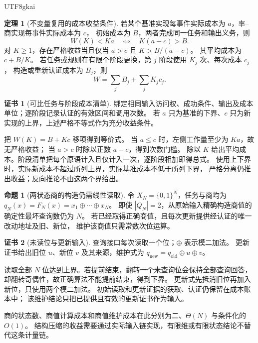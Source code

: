 \documentclass[12pt]{report}
\makeatletter
\theoremstyle{definition}
\newtheorem{theorem}{定理}[chapter]
\newtheorem{proposition}{命题}[chapter]
\newtheorem{Certificate}{证书}[chapter]
\renewenvironment{proof}[1][\proofname]{\par
  \pushQED{\qed}\normalfont
  \topsep6\p@\@plus6\p@\relax
  \trivlist
  \item[\hskip\labelsep\normalfont #1\@addpunct{.}]\ignorespaces
}{
  \popQED\endtrivlist\@endpefalse
}
\makeatother
\begin{document}
\begin{CJK*}{UTF8}{gkai}
\begin{theorem}[不变量复用的成本收益条件]
\label{thm:amortized-quotient-cost}
若某个基准实现每事件实际成本为 \(a\)，率--商实现每事件实际成本为 \(c\)，
初始成本为 \(B\)，两者完成同一任务和输出义务，则
\[
W(K)<Ka\quad\Longleftrightarrow\quad K(a-c)>B.
\]
对 \(K\ge1\)，存在严格收益当且仅当 \(a>c\) 且 \(K>B/(a-c)\)。
其平均成本为 \(c+B/K\)。
若任务或规则在有限个阶段更换，第 \(j\) 阶段使用 \(K_j\) 次、每次成本 \(c_j\)，
构造或重新认证成本为 \(B_j\)，则
\[
W=\sum_j B_j+\sum_j K_jc_j.
\]
\end{theorem}
\begin{Certificate}[可比任务与阶段成本清单]
绑定相同输入访问权、成功条件、输出及成本单位；逐阶段记录认证的有效区间和调用次数。
若 \(a\) 只为基准的下界、\(c\) 只为新实现的上界，上述严格不等式作为充分收益条件。
\end{Certificate}
\begin{proof}
把 \(W(K)=B+Kc\) 移项得到等价式。
当 \(a\le c\) 时，左侧工作量至少为 \(Ka\)，故无严格收益；
当 \(a>c\) 时除以正数 \(a-c\)，得到次数门槛。
除以 \(K\) 给出平均成本。阶段清单把每个原语计入且仅计入一次，逐阶段相加即得总式。
使用上下界时，实际新成本不超过所列上界，实际基准成本不低于所列下界，
严格分离仍推出收益；反向推论不由这两个界给出。
\end{proof}

\begin{proposition}[两状态商的构造仍需线性读取]
\label{prop:parity-quotient-cost}
令 \(X_N=\{0,1\}^N\)，任务与商均为
\(q_N(x)=F_N(x)=x_1\oplus\cdots\oplus x_N\)。
即使 \(|Q_N|=2\)，从原始输入精确构造商值的确定性最坏查询数仍为 \(N\)。
若已经取得正确商值，且每次更新提供经认证的唯一改动地址及旧、新位，
维护该商值只需常数次位运算。
\end{proposition}
\begin{Certificate}[未读位与更新输入]
查询接口每次读取一个位；\(\oplus\) 表示模二加法。
更新证书给出旧位 \(u\)、新位 \(v\) 及其来源，维护式为
\(q_{\mathrm{new}}=q_{\mathrm{old}}\oplus u\oplus v\)。
\end{Certificate}
\begin{proof}
读取全部 \(N\) 位达到上界。若提前结束，翻转一个未查询位会保持全部查询回答，
却翻转奇偶性，故正确算法不能提前结束，得到下界。
更新式先抵消旧位再加入新位，只使用两个模二加法。
初始读取和更新证据的获取、认证仍保留在成本账本中；
该维护结论只把已提供且有效的更新证书作为输入。
\end{proof}
商的状态数、商值计算成本和商值维护成本在此分别为二、\(\Theta(N)\) 与条件化的 \(O(1)\)。
结构压缩的收益需要通过实际输入链实现，有限维或有限状态结论不替代这条计量链。


\end{CJK*}
\end{document}
